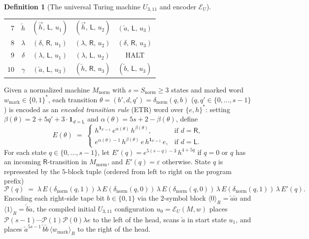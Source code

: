 \documentclass[11pt,reqno]{amsart}
\numberwithin{equation}{section}
\theoremstyle{plain}
\theoremstyle{definition}
\newtheorem{definition}[theorem]{Definition}
\theoremstyle{remark}
\begin{document}
\begin{definition}[The universal Turing machine $U_{3,11}$ and encoder $\mathcal{E}_U$]
\begin{table}[htbp]
\begin{tabular}{@{}rc@{\qquad}ccc@{}}
$7$  & $\overleftarrow{h}$ & $(\overrightarrow{h},\, \mathsf{L},\, u_1)$ & $(\overrightarrow{h},\, \mathsf{L},\, u_2)$ & $(\overleftarrow{a},\, \mathsf{L},\, u_3)$ \\
$8$  & $\lambda$           & $(\delta,\, \mathsf{R},\, u_1)$             & $(\lambda,\, \mathsf{R},\, u_2)$           & $(\delta,\, \mathsf{R},\, u_3)$ \\
$9$  & $\delta$            & $(\lambda,\, \mathsf{L},\, u_1)$            & $(\lambda,\, \mathsf{L},\, u_2)$           & \textrm{HALT} \\
$10$ & $\gamma$            & $(\overleftarrow{a},\, \mathsf{L},\, u_3)$ & $(\overleftarrow{h},\, \mathsf{R},\, u_3)$ & $(\overleftarrow{b},\, \mathsf{L},\, u_3)$ \\
\bottomrule
\end{tabular}
\end{table}

Given a normalized machine $M_{\mathrm{norm}}$ with $s = S_{\mathrm{norm}} \ge 3$ states and marked word $w_{\mathrm{mark}} \in \{0,1\}^*$, each transition $\theta = (b', d, q') = \delta_{\mathrm{norm}}(q, b)$ ($q, q' \in \{0,\dots,s-1\}$) is encoded as an \emph{encoded transition rule} (ETR) word over $\{e, h\}^*$: setting $\beta(\theta) = 2 + 5q' + 3\cdot\mathbf{1}_{d = \mathsf{L}}$ and $\alpha(\theta) = 5s + 2 - \beta(\theta)$, define
\[
  E(\theta) \;=\; \begin{cases}
    h^{\mathbf{1}_{b'=1}}\, e^{\alpha(\theta)}\, h^{\beta(\theta)}, & \textrm{if } d = \mathsf{R}, \\
    e^{\alpha(\theta)-1}\, h^{\beta(\theta)}\, e\, h^{\mathbf{1}_{b'=1}}\, e, & \textrm{if } d = \mathsf{L}.
  \end{cases}
\]
For each state $q \in \{0,\dots,s-1\}$, let $E'(q) = e^{5(s-q)-3}\,h^{4+5q}$ if $q = 0$ or $q$ has an incoming $\mathsf{R}$-transition in $M_{\mathrm{norm}}$, and $E'(q) = \varepsilon$ otherwise. State $q$ is represented by the $5$-block tuple (ordered from left to right on the program prefix)
\[
  \mathcal{P}(q) \;=\; \lambda\,E(\delta_{\mathrm{norm}}(q,1))\,\lambda\,E(\delta_{\mathrm{norm}}(q,0))\,\lambda\,E(\delta_{\mathrm{norm}}(q,0))\,\lambda\,E(\delta_{\mathrm{norm}}(q,1))\,\lambda\,E'(q).
\]
Encoding each right-side tape bit $b \in \{0,1\}$ via the $2$-symbol block $\langle 0 \rangle_R = \overleftarrow{a}\overleftarrow{a}$ and $\langle 1 \rangle_R = \overleftarrow{b}\overleftarrow{a}$, the compiled initial $U_{3,11}$ configuration $u_0 = \mathcal{E}_U(M, w)$ places $\mathcal{P}(s-1)\cdots\mathcal{P}(1)\mathcal{P}(0)\lambda e$ to the left of the head, scans $\overleftarrow{a}$ in start state $u_1$, and places $\overleftarrow{a}^{5s-1}\,\overleftarrow{b}\overleftarrow{b}\,\langle w_{\mathrm{mark}} \rangle_R$ to the right of the head.
\end{definition}
\end{document}
